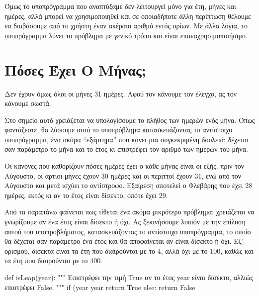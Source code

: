 \documentclass[a4paper,11pt,oneside]{book}
\begin{document}
Όμως το υποπρόγραμμα που αναπτύξαμε δεν λειτουργεί μόνο για έτη, μήνες και ημέρες, αλλά μπορεί να χρησιμοποιηθεί και σε οποιαδήποτε άλλη περίπτωση θέλουμε να διαβάσουμε από το χρήστη έναν ακέραιο αριθμό εντός ορίων. Με άλλα λόγια, το υποπρόγραμμα λύνει το πρόβλημα με γενικό τρόπο και είναι επαναχρησιμοποιήσιμο.



\section{Πόσες Έχει Ο Μήνας;}

\begin{question}
Δεν έχουν όμως όλοι οι μήνες 31 ημέρες. Αφού τον κάνουμε τον έλεγχο, ας τον κάνουμε σωστά.
\end{question}

Στο σημείο αυτό χρειάζεται να υπολογίσουμε το πλήθος των ημερών ενός μήνα. Όπως φαντάζεστε, θα λύσουμε αυτό το υποπρόβλημα κατασκευάζοντας το αντίστοιχο υποπρόγραμμα, ένα ακόμα ``εξάρτημα'' που κάνει μια συγκεκριμένη δουλειά: δέχεται σαν παράμετρο το μήνα και το έτος κι επιστρέφει τον αριθμό των ημερών του μήνα.

Οι κανόνες που καθορίζουν πόσες ημέρες έχει ο κάθε μήνας είναι οι εξής: 
πριν τον Αύγουστο, οι άρτιοι μήνες έχουν 30 ημέρες και οι περιττοί έχουν 31, ενώ από τον Αύγουστο και μετά ισχύει το αντίστροφο. Εξαίρεση αποτελεί ο Φλεβάρης που έχει 28 ημέρες, εκτός κι αν το έτος είναι δίσεκτο, οπότε έχει 29.

Από τα παραπάνω φαίνεται πως τίθεται ένα ακόμα μικρότερο πρόβλημα: χρειάζεται να γνωρίζουμε αν ένα έτος είναι δίσεκτο ή όχι. Ας ξεκινήσουμε λοιπόν με την επίλυση αυτού του υποπροβλήματος, κατασκευάζοντας το αντίστοιχο υποπρόγραμμα, το οποίο θα δέχεται σαν παράμετρο ένα έτος και θα αποφαίνεται αν είναι δίσεκτο ή όχι. Εξ' ορισμού, δίσεκτα είναι τα έτη που διαιρούνται με το 4, αλλά όχι με το 100, καθώς και τα έτη που διαιρούνται με το 400.

\begin{pycode}
def isLeap(year):
    """ Επιστρέφει την τιμή True αν το έτος year
    είναι δίσεκτο, αλλιώς επιστρέφει False.
    """
    if (year %
      year %
        return True
    else:
        return False
\end{pycode}
\end{document}

